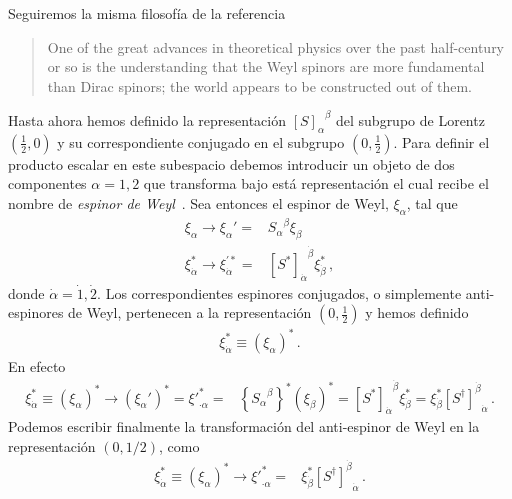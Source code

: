 Seguiremos la misma filosofía de la referencia~\cite{Zee:2016fuk}
\begin{quote}
  One of the great advances in theoretical physics over the past half-century or so is the
understanding that the Weyl spinors are more fundamental than Dirac spinors; the world
appears to be constructed out of them.
\end{quote}

\begin{frame}
  Hasta ahora hemos definido la representación ${[S]_{\alpha}}^{\beta}$ del subgrupo de Lorentz $(\frac{1}{2},0)$ y su correspondiente conjugado en el subgrupo $(0,\frac{1}{2})$. Para definir el producto escalar en este subespacio debemos introducir un objeto de dos componentes $\alpha=1,2$ que transforma bajo está representación el cual recibe el nombre de \emph{espinor de Weyl}~\cite{Dreiner:2008tw,Quevedo:2010ui}. Sea entonces el espinor de Weyl, $\xi_{\alpha}$, tal que
  \begin{align}
      \label{eq:subalpha}
    \xi_{\alpha} \to \xi_{\alpha}'=&{S_{\alpha}}^{\beta}\xi_{\beta} \\
  \xi_{\dot{\alpha}}^{*}\to \xi_{\dot{\alpha}}^{\prime *}
  =&{\left[ S^{*} \right]_{\dot{\alpha}}}^{\dot{\beta}}\xi_{\dot{\beta}}^{*}\,,
\end{align}
donde $\dot{\alpha}=\dot{1},\dot{2}$.  Los correspondientes espinores conjugados, o simplemente anti-espinores de Weyl, pertenecen a la representación $\left( 0,\frac{1}{2}\right)$ y hemos
definido
\begin{align}
\xi_{\dot{\alpha}}^{*}\equiv  \left( \xi_{\alpha} \right)^{*}\,.
\end{align}
En efecto
\begin{align}
 \xi_{\dot{\alpha}}^{*}\equiv \left( \xi_{\alpha} \right)^{*} \to \left( \xi_{\alpha}' \right)^{*}={\xi'}^*_{\cdot{\alpha}}=&
 \left\{ {S_{\alpha}}^{\beta} \right\}^{*} \left( \xi_{\beta} \right)^{*} = {\left[ S^{*} \right]_{\dot{\alpha}}}^{\dot{\beta}}\xi_{\dot{\beta}}^{*}
=\xi_{\dot{\beta}}^{*}{\left[ S^{\dagger} \right]^{\dot{\beta}}}_{\dot{\alpha}}                                                                                                                              \,.
\end{align}
Podemos escribir finalmente la transformación del anti-espinor de Weyl en la representación $
\left(
  0,1/2
\right)$, como
\begin{align}
  \label{eq:antispinorright}
 \xi_{\dot{\alpha}}^{*}\equiv \left( \xi_{\alpha} \right)^{*} \to {\xi'}^*_{\cdot{\alpha}}=&
 \xi_{\dot{\beta}}^{*}{\left[ S^{\dagger} \right]^{\dot{\beta}}}_{\dot{\alpha}}\,.
\end{align}


\end{frame}
